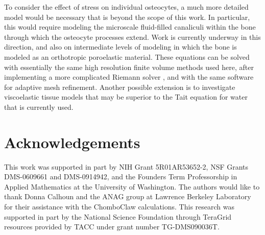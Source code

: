 \documentclass{article}
\begin{document}
To consider the effect of stress on individual osteocytes,
a much more detailed model would be necessary that is beyond the scope
of this work.  In particular, 
this would require modeling the microscale fluid-filled canaliculi
within the bone through which the osteocyte processes extend. Work is
currently underway in this direction, and also on intermediate levels of
modeling in which the bone is modeled as an orthotropic poroelastic
material.  These equations can be solved with essentially the same high
resolution finite volume methods used here, after implementing a more
complicated Riemann solver \cite{Lemoine-phd,LemoineOuLeVeque2013}, 
and with the same software for adaptive mesh refinement.
Another possible extension is to
investigate viscoelastic tissue models that may be superior to the
Tait equation for water that is currently used.  


\section*{Acknowledgements}
This work was supported in part by NIH Grant 5R01AR53652-2,
NSF Grants DMS-0609661 and DMS-0914942, and the Founders Term Professorship
in Applied Mathematics at the University of Washington.
The authors would like to thank Donna Calhoun and the ANAG 
group at Lawrence Berkeley Laboratory for their assistance with the ChomboClaw calculations.
This research was supported in part by the National Science Foundation through 
TeraGrid resources provided by TACC under grant number TG-DMS090036T.



\end{document}
